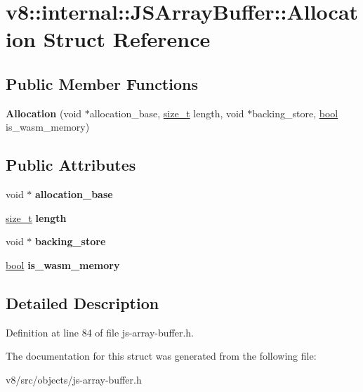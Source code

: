 \hypertarget{structv8_1_1internal_1_1JSArrayBuffer_1_1Allocation}{}\section{v8\+:\+:internal\+:\+:J\+S\+Array\+Buffer\+:\+:Allocation Struct Reference}
\label{structv8_1_1internal_1_1JSArrayBuffer_1_1Allocation}
\subsection*{Public Member Functions}
\begin{DoxyCompactItemize}
\item 
\mbox{\label{structv8_1_1internal_1_1JSArrayBuffer_1_1Allocation_a99a2b6a7e3b3647db50f7731060a0dc3}} 
{\bfseries Allocation} (void $\ast$allocation\+\_\+base, \mbox{\hyperlink{classsize__t}{size\+\_\+t}} length, void $\ast$backing\+\_\+store, \mbox{\hyperlink{classbool}{bool}} is\+\_\+wasm\+\_\+memory)
\end{DoxyCompactItemize}
\subsection*{Public Attributes}
\begin{DoxyCompactItemize}
\item 
\mbox{\label{structv8_1_1internal_1_1JSArrayBuffer_1_1Allocation_a5eba5485feecb012389977394a19e340}} 
void $\ast$ {\bfseries allocation\+\_\+base}
\item 
\mbox{\label{structv8_1_1internal_1_1JSArrayBuffer_1_1Allocation_a2ca0ca3c8d8d5bdab5caa7fb9ecb7715}} 
\mbox{\hyperlink{classsize__t}{size\+\_\+t}} {\bfseries length}
\item 
\mbox{\label{structv8_1_1internal_1_1JSArrayBuffer_1_1Allocation_ad1ac75ccb25fe9f7b29202a95415450b}} 
void $\ast$ {\bfseries backing\+\_\+store}
\item 
\mbox{\label{structv8_1_1internal_1_1JSArrayBuffer_1_1Allocation_ad8f9d035f58eafb7c4c23fed4084a21c}} 
\mbox{\hyperlink{classbool}{bool}} {\bfseries is\+\_\+wasm\+\_\+memory}
\end{DoxyCompactItemize}


\subsection{Detailed Description}


Definition at line 84 of file js-\/array-\/buffer.\+h.



The documentation for this struct was generated from the following file\+:\begin{DoxyCompactItemize}
\item 
v8/src/objects/js-\/array-\/buffer.\+h\end{DoxyCompactItemize}

